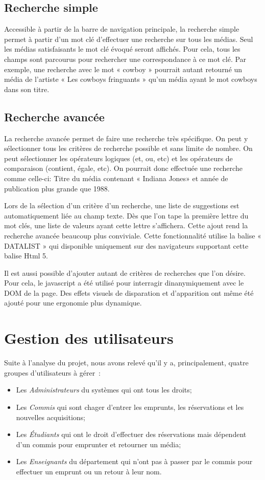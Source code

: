 \documentclass[letter, 11pt]{report}
\begin{document}
\subsection{Recherche simple}
Accessible à partir de la barre de navigation principale, la recherche simple permet à partir d'un mot clé d'effectuer une recherche sur tous les médias. Seul les médias satisfaisants le mot clé évoqué seront affichés. Pour cela, tous les champs sont parcourus pour rechercher une correspondance à ce mot clé. Par exemple, une recherche avec le mot « cowboy » pourrait autant retourné un média de l'artiste « Les cowboys fringuants » qu'un média ayant le mot cowboys dans son titre. 

\subsection{Recherche avancée}
\label{sec:recherche-avancée}
La recherche avancée permet de faire une recherche très spécifique. On peut y sélectionner tous les critères de recherche possible et sans limite de nombre. On peut sélectionner les opérateurs logiques (et, ou, etc) et les opérateurs de comparaison (contient, égale, etc). On pourrait donc effectuée une recherche comme celle-ci: Titre du média contenant « Indiana Jones» et année de publication plus grande que 1988.

Lors de la sélection d'un critère d'un recherche, une liste de suggestions est automatiquement liée au champ texte. Dès que l'on tape la première lettre du mot clés, une liste de valeurs ayant cette lettre s'affichera. Cette ajout rend la recherche avancée beaucoup plus conviviale. Cette fonctionnalité utilise la balise « DATALIST » qui disponible uniquement sur des navigateurs supportant cette balise Html 5.

Il est aussi possible d'ajouter autant de critères de recherches que l'on désire. Pour cela, le javascript a été utilisé pour interragir dinanymiquement avec le DOM de la page. Des effets visuels de disparation et d'apparition ont même été ajouté pour une ergonomie plus dynamique.

\section{Gestion des utilisateurs}

Suite à l'analyse du projet, nous avons relevé qu'il y a, principalement, quatre groupes d'utilisateurs à gérer~:
\begin{itemize}
	\item Les \emph{Administrateurs} du systèmes qui ont tous les droits;
	\item Les \emph{Commis} qui sont chager d'entrer les emprunts, les réservations et les nouvelles acquisitions;
	\item Les \emph{Étudiants} qui ont le droit d'effectuer des réservations mais dépendent d'un commis pour emprunter et retourner un média;
	\item Les \emph{Enseignants} du département qui n'ont pas à passer par le commis pour effectuer un emprunt ou un retour à leur nom.
\end{itemize}
\end{document}
